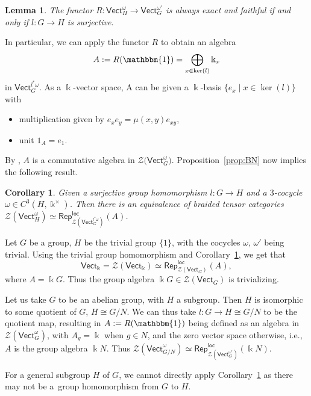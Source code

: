 \documentclass[10pt,a4paper]{amsart}
\numberwithin{equation}{section}
\newtheorem{Corollary}[Theorem]{Corollary}
\newtheorem{Lemma}[Theorem]{Lemma}
\newcommand{\locmod}{\mathsf{Rep}^{\mathsf{loc}}}
\newcommand{\Vect}{\mathsf{Vect}}
\newcommand{\cZ}{\mathcal{Z}}
\begin{document}
\begin{Lemma}%
The functor $R\colon \Vect_H^{\omega} \to \Vect_G^{\omega'}$ is always exact and faithful if and only if $l\colon G\to H$ is surjective.
\end{Lemma}


In particular, we can apply the functor $R$ to obtain an algebra
\[A:= R(\mathbbm{1}) = \bigoplus\limits_{x \in \ker(l)}\Bbbk_x \] in $\Vect_G^{l^*\omega}$.
As a $\Bbbk$-vector space, A can be given a $\Bbbk$-basis $\{e_x \mid x \in \ker (l)\}$ with
\begin{itemize}\itemsep=0pt
 \item multiplication given by $e_xe_y = \mu(x,y) e_{xy}$,
 \item unit $1_A = e_1$.
\end{itemize}
By \cite[Proposition 6.1]{BN11}, $A$ is a commutative algebra in $\cZ\big(\Vect_G^\omega\big)$.
Proposition~\ref{prop:BN} now implies the following result.

\begin{Corollary}\label{cor:gen-equiv}
Given a surjective group homomorphism $l\colon G\!\to\! H$ and a $3$-cocycle ${\omega\in C^3(H,\Bbbk^\times)}$.
Then there is an equivalence of braided tensor categories $\cZ(\Vect_H^{\omega})\simeq \locmod_{\cZ(\Vect_G^{l^*\omega})}(A)$.
\end{Corollary}

\begin{Example}
Let $G$ be a group, $H$ be the trivial group $\{1\}$, with the cocycles $\omega$, $\omega'$ being trivial. Using the trivial group homomorphism and Corollary~\ref{cor:gen-equiv}, we get that
\[\Vect_\Bbbk=\cZ(\Vect_\Bbbk) \simeq \locmod_{\cZ(\Vect_G)}(A),\]
where $A = \Bbbk G$. Thus the group algebra $\Bbbk G \in \cZ(\Vect_G)$ is trivializing.
\end{Example}

\begin{Example}
Let us take $G$ to be an abelian group, with $H$ a subgroup. Then $H$ is isomorphic to some quotient of $G$, $H \cong G/N$. We can thus take $l \colon G \to H \cong G/N$ to be the quotient map, resulting in $A:= R(\mathbbm{1})$ being defined as an algebra in $\cZ(\Vect_G^{\omega})$, with $A_g =\Bbbk$ when $g \in N$, and the zero vector space otherwise, i.e., $A$ is the group algebra $\Bbbk N$. Thus ${\cZ(\Vect^\omega_{G/N}) \simeq \locmod_{\cZ(\Vect_G^{\omega'})}(\Bbbk N)}$.
\end{Example}


For a general subgroup $H$ of $G$, we cannot directly apply Corollary~\ref{cor:gen-equiv} as there may not be a~group homomorphism from $G$ to $H$.
\end{document}
